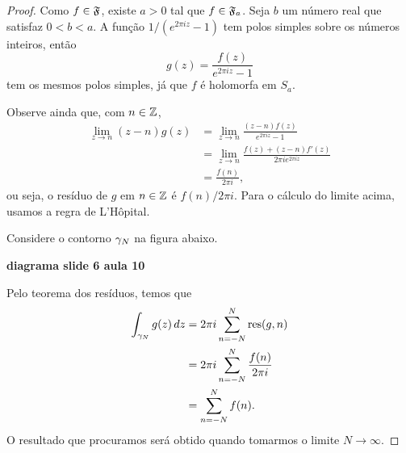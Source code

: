         \begin{proof}
            Como $f\in\mathfrak{F}$, existe $a > 0$ tal que $f\in\mathfrak{F}_a$. Seja 
            $b$ um número real que satisfaz $0<b<a$. A função $1/(e^{2\pi i z} - 1)$ 
            tem polos simples sobre os números inteiros, então
            \begin{equation*}
                g(z) = \frac{f(z)}{e^{2\pi i z} - 1}
            \end{equation*}
            tem os mesmos polos simples, já que $f$ é holomorfa em $S_a$. 
            
            Observe ainda que, com $n \in \mathbb{Z}$,
            \begin{align*}
                \lim_{z \to n} (z-n)g(z) & = 
                \lim_{z \to n} \frac{(z-n)f(z)}{e^{2\pi i z} - 1}\\
                &= \lim_{z \to n} \frac{f(z) + (z-n)f'(z)}{2\pi ie^{2\pi i z}} \\
                &= \frac{f(n)}{2\pi i},
            \end{align*}
            ou seja, o resíduo de $g$ em $n \in \mathbb{Z}$ é $f(n)/2\pi i$. Para o cálculo do limite acima,
            usamos a regra de L'Hôpital.
            
            Considere o contorno $\gamma_N$ na figura abaixo. 
            \begin{center}
                {\bf diagrama slide 6 aula 10}
            \end{center}
            Pelo teorema dos resíduos, temos que 
            \begin{align*}
                \int_{\gamma_N}g(z)\,dz &= 2\pi i\sum_{n=-N}^{N}\operatorname{res}(g,n)\\
                &= 2 \pi i\sum_{n=-N}^{N}\frac{f(n)}{2 \pi i}\\
                &= \sum_{n=-N}^{N}f(n).
            \end{align*}
            O resultado que procuramos será obtido quando tomarmos o limite $N \to \infty$. 
            

\end{proof}
